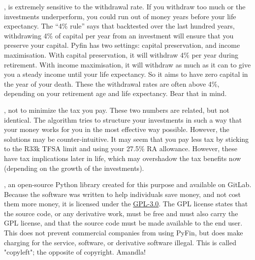 \documentclass[a4paper, justified]{tufte-handout}
\begin{document}
, is extremely sensitive to the withdrawal rate. If you withdraw too much or the investments underperform, you could run out of money years before your life expectancy. The ``4\% rule'' says that backtested over the last hundred years, withdrawing 4\% of capital per year from an investment will ensure that you preserve your capital. Pyfin has two settings: capital preservation, and income maximisation. With capital preservation, it will withdraw 4\% per year during retirement. With income maximisation, it will withdraw as much as it can to give you a steady income until your life expectancy. So it aims to have zero capital in the year of your death. These the withdrawal rates are often above 4\%, depending on your retirement age and life expectancy. Bear that in mind.

, not to minimize the tax you pay. These two numbers are related, but not identical. The algorithm tries to structure your investments in such a way that your money works for you in the most effective way possible. However, the solutions may be counter-intuitive. It may seem that you pay less tax by sticking to the R33k TFSA limit and using your 27.5\% RA allowance. However, these have tax implications later in life, which may overshadow the tax benefits now (depending on the growth of the investments). 

, an open-source Python library created for this purpose and available on GitLab. Because the software was written to help individuals save money, and not cost them more money, it is licensed under the \href{https://opensource.org/licenses/GPL-3.0}{GPL-3.0}. The GPL license states that the source code, or any derivative work, must be free and must also carry the GPL license, and that the source code must be made available to the end user. This does not prevent commercial companies from using PyFin, but does make charging for the service, software, or derivative software illegal. This is called "copyleft"; the opposite of copyright. Amandla!
\end{document}
